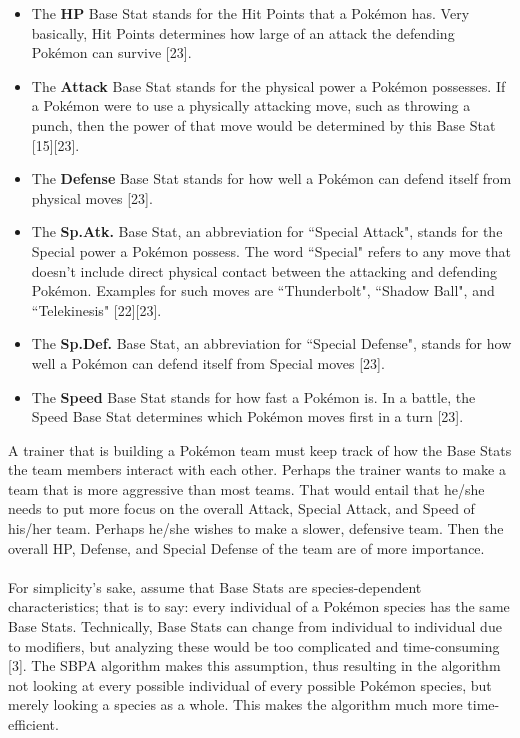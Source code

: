 \documentclass{article}
\begin{document}
\begin{itemize}
	\item The \textbf{HP} Base Stat stands for the Hit Points that a Pok\'emon has. Very basically, Hit Points determines how large of an attack the defending Pok\'emon can survive [23].
	\item The \textbf{Attack} Base Stat stands for the physical power a Pok\'emon possesses. If a Pok\'emon were to use a physically attacking move, such as throwing a punch, then the power of that move would be determined by this Base Stat [15][23]. 
	\item The \textbf{Defense} Base Stat stands for how well a Pok\'emon can defend itself from physical moves [23]. 
	\item The \textbf{Sp.Atk.} Base Stat, an abbreviation for ``Special Attack", stands for the Special power a Pok\'emon possess. The word ``Special" refers to any move that doesn't include direct physical contact between the attacking and defending Pok\'emon. Examples for such moves are ``Thunderbolt", ``Shadow Ball", and ``Telekinesis" [22][23].
	\item The \textbf{Sp.Def.} Base Stat, an abbreviation for ``Special Defense", stands for how well a Pok\'emon can defend itself from Special moves [23].
	\item The \textbf{Speed} Base Stat stands for how fast a Pok\'emon is. In a battle, the Speed Base Stat determines which Pok\'emon moves first in a turn [23].
\end{itemize}
A trainer that is building a Pok\'emon team must keep track of how the Base Stats the team members interact with each other. Perhaps the trainer wants to make a team that is more aggressive than most teams. That would entail that he/she needs to put more focus on the overall Attack, Special Attack, and Speed of his/her team. Perhaps he/she wishes to make a slower, defensive team. Then the overall HP, Defense, and Special Defense of the team are of more importance.\\\\
For simplicity's sake, assume that Base Stats are species-dependent characteristics; that is to say: every individual of a Pok\'emon species has the same Base Stats. Technically, Base Stats can change from individual to individual due to modifiers, but analyzing these would be too complicated and time-consuming [3]. The SBPA algorithm makes this assumption, thus resulting in the algorithm not looking at every possible individual of every possible Pok\'emon species, but merely looking a species as a whole. This makes the algorithm much more time-efficient.
\end{document}
